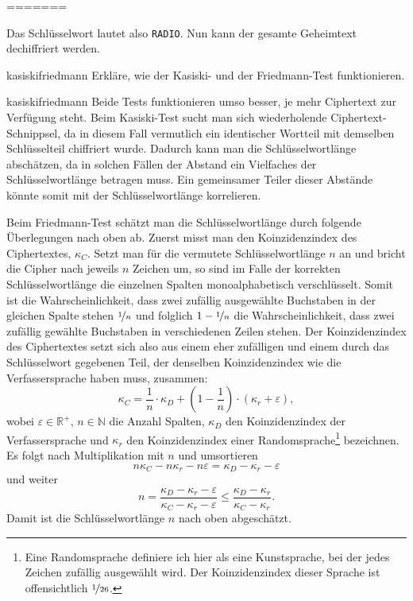 \documentclass[%
<<<<<<< Updated upstream
11pt,%
twoside,%
titlepage,%
german,%
headsepline%
]{scrartcl}
\begin{document}
=======

Das Schlüsselwort lautet also \texttt{RADIO}. Nun kann der gesamte Geheimtext dechiffriert werden.

\begin{uebenv}{kasiskifriedmann}
    Erkläre, wie der Kasiski- und der Friedmann-Test funktionieren.
\end{uebenv}

\begin{lsg}{kasiskifriedmann}
    Beide Tests funktionieren umso besser, je mehr Ciphertext zur Verfügung steht. Beim Kasiski-Test sucht man sich wiederholende Ciphertext-Schnippsel, da in diesem Fall vermutlich ein identischer Wortteil mit demselben Schlüsselteil chiffriert wurde. Dadurch kann man die Schlüsselwortlänge abschätzen, da in solchen Fällen der Abstand ein Vielfaches der Schlüsselwortlänge betragen muss. Ein gemeinsamer Teiler dieser Abstände könnte somit mit der Schlüsselwortlänge korrelieren.

    Beim Friedmann-Test schätzt man die Schlüsselwortlänge durch folgende Überlegungen nach oben ab. Zuerst misst man den Koinzidenzindex des Ciphertextes, $\kappa_C$. Setzt man für die vermutete Schlüsselwortlänge $n$ an und bricht die Cipher nach jeweils $n$ Zeichen um, so sind im Falle der korrekten Schlüsselwortlänge die einzelnen Spalten monoalphabetisch verschlüsselt. Somit ist die Wahrscheinlichkeit, dass zwei zufällig ausgewählte Buchstaben in der gleichen Spalte stehen $\nicefrac{1}{n}$ und folglich $1-\nicefrac{1}{n}$ die Wahrscheinlichkeit, dass zwei zufällig gewählte Buchstaben in verschiedenen Zeilen stehen. Der Koinzidenzindex des Ciphertextes setzt sich also aus einem eher zufälligen und einem durch das Schlüsselwort gegebenen Teil, der denselben Koinzidenzindex wie die Verfassersprache haben muss, zusammen:
    $$\kappa_C=\frac{1}{n}\cdot \kappa_D+(1-\frac{1}{n})\cdot (\kappa_r+\varepsilon),$$
    wobei $\varepsilon\in\mathbb{R}^+$,  $n\in\mathbb{N}$ die Anzahl Spalten, $\kappa_D$ den Koinzidenzindex der Verfassersprache und $\kappa_r$ den Koinzidenzindex einer Randomsprache\footnote{Eine Randomsprache definiere ich hier als eine Kunstsprache, bei der jedes Zeichen zufällig ausgewählt wird. Der Koinzidenzindex dieser Sprache ist offensichtlich $\nicefrac{1}{26}$.} bezeichnen. Es folgt nach Multiplikation mit $n$ und umsortieren
    $$n\kappa_C-n\kappa_r-n\varepsilon=\kappa_D-\kappa_r-\varepsilon$$
    und weiter
    $$n=\frac{\kappa_D-\kappa_r-\varepsilon}{\kappa_C-\kappa_r-\varepsilon}\leq\frac{\kappa_D-\kappa_r}{\kappa_C-\kappa_r}.$$
    Damit ist die Schlüsselwortlänge $n$ nach oben abgeschätzt.
\end{lsg}
\end{document}
